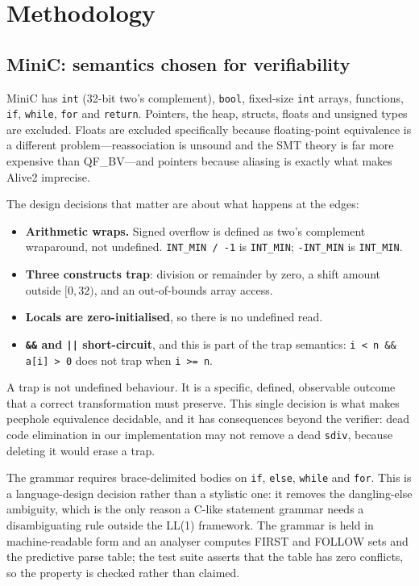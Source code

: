 \documentclass[conference]{IEEEtran}
\begin{document}
\section{Methodology}

\subsection{MiniC: semantics chosen for verifiability}

MiniC has \texttt{int} (32-bit two's complement), \texttt{bool}, fixed-size
\texttt{int} arrays, functions, \texttt{if}, \texttt{while}, \texttt{for} and
\texttt{return}. Pointers, the heap, structs, floats and unsigned types are
excluded. Floats are excluded specifically because floating-point equivalence
is a different problem---reassociation is unsound and the SMT theory is far
more expensive than QF\_BV---and pointers because aliasing is exactly what
makes Alive2 imprecise.

The design decisions that matter are about what happens at the edges:

\begin{itemize}
\item \textbf{Arithmetic wraps.} Signed overflow is defined as two's complement
wraparound, not undefined. \texttt{INT\_MIN / -1} is \texttt{INT\_MIN};
\texttt{-INT\_MIN} is \texttt{INT\_MIN}.
\item \textbf{Three constructs trap}: division or remainder by zero, a shift
amount outside $[0,32)$, and an out-of-bounds array access.
\item \textbf{Locals are zero-initialised}, so there is no undefined read.
\item \textbf{\texttt{\&\&} and \texttt{||} short-circuit}, and this is part of
the trap semantics: \texttt{i < n \&\& a[i] > 0} does not trap when
\texttt{i >= n}.
\end{itemize}

A trap is not undefined behaviour. It is a specific, defined, observable
outcome that a correct transformation must preserve. This single decision is
what makes peephole equivalence decidable, and it has consequences beyond the
verifier: dead code elimination in our implementation may not remove a dead
\texttt{sdiv}, because deleting it would erase a trap.

The grammar requires brace-delimited bodies on \texttt{if}, \texttt{else},
\texttt{while} and \texttt{for}. This is a language-design decision rather than
a stylistic one: it removes the dangling-else ambiguity, which is the only
reason a C-like statement grammar needs a disambiguating rule outside the LL(1)
framework. The grammar is held in machine-readable form and an analyser
computes FIRST and FOLLOW sets and the predictive parse table; the test suite
asserts that the table has zero conflicts, so the property is checked rather
than claimed.
\end{document}
